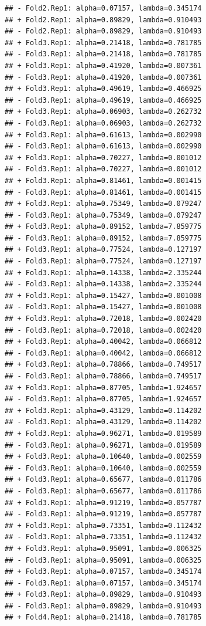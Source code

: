 \documentclass[
]{article}
\begin{document}
\begin{verbatim}
## - Fold2.Rep1: alpha=0.07157, lambda=0.345174 
## + Fold2.Rep1: alpha=0.89829, lambda=0.910493 
## - Fold2.Rep1: alpha=0.89829, lambda=0.910493 
## + Fold3.Rep1: alpha=0.21418, lambda=0.781785 
## - Fold3.Rep1: alpha=0.21418, lambda=0.781785 
## + Fold3.Rep1: alpha=0.41920, lambda=0.007361 
## - Fold3.Rep1: alpha=0.41920, lambda=0.007361 
## + Fold3.Rep1: alpha=0.49619, lambda=0.466925 
## - Fold3.Rep1: alpha=0.49619, lambda=0.466925 
## + Fold3.Rep1: alpha=0.06903, lambda=0.262732 
## - Fold3.Rep1: alpha=0.06903, lambda=0.262732 
## + Fold3.Rep1: alpha=0.61613, lambda=0.002990 
## - Fold3.Rep1: alpha=0.61613, lambda=0.002990 
## + Fold3.Rep1: alpha=0.70227, lambda=0.001012 
## - Fold3.Rep1: alpha=0.70227, lambda=0.001012 
## + Fold3.Rep1: alpha=0.81461, lambda=0.001415 
## - Fold3.Rep1: alpha=0.81461, lambda=0.001415 
## + Fold3.Rep1: alpha=0.75349, lambda=0.079247 
## - Fold3.Rep1: alpha=0.75349, lambda=0.079247 
## + Fold3.Rep1: alpha=0.89152, lambda=7.859775 
## - Fold3.Rep1: alpha=0.89152, lambda=7.859775 
## + Fold3.Rep1: alpha=0.77524, lambda=0.127197 
## - Fold3.Rep1: alpha=0.77524, lambda=0.127197 
## + Fold3.Rep1: alpha=0.14338, lambda=2.335244 
## - Fold3.Rep1: alpha=0.14338, lambda=2.335244 
## + Fold3.Rep1: alpha=0.15427, lambda=0.001008 
## - Fold3.Rep1: alpha=0.15427, lambda=0.001008 
## + Fold3.Rep1: alpha=0.72018, lambda=0.002420 
## - Fold3.Rep1: alpha=0.72018, lambda=0.002420 
## + Fold3.Rep1: alpha=0.40042, lambda=0.066812 
## - Fold3.Rep1: alpha=0.40042, lambda=0.066812 
## + Fold3.Rep1: alpha=0.78866, lambda=0.749517 
## - Fold3.Rep1: alpha=0.78866, lambda=0.749517 
## + Fold3.Rep1: alpha=0.87705, lambda=1.924657 
## - Fold3.Rep1: alpha=0.87705, lambda=1.924657 
## + Fold3.Rep1: alpha=0.43129, lambda=0.114202 
## - Fold3.Rep1: alpha=0.43129, lambda=0.114202 
## + Fold3.Rep1: alpha=0.96271, lambda=0.019589 
## - Fold3.Rep1: alpha=0.96271, lambda=0.019589 
## + Fold3.Rep1: alpha=0.10640, lambda=0.002559 
## - Fold3.Rep1: alpha=0.10640, lambda=0.002559 
## + Fold3.Rep1: alpha=0.65677, lambda=0.011786 
## - Fold3.Rep1: alpha=0.65677, lambda=0.011786 
## + Fold3.Rep1: alpha=0.91219, lambda=0.057787 
## - Fold3.Rep1: alpha=0.91219, lambda=0.057787 
## + Fold3.Rep1: alpha=0.73351, lambda=0.112432 
## - Fold3.Rep1: alpha=0.73351, lambda=0.112432 
## + Fold3.Rep1: alpha=0.95091, lambda=0.006325 
## - Fold3.Rep1: alpha=0.95091, lambda=0.006325 
## + Fold3.Rep1: alpha=0.07157, lambda=0.345174 
## - Fold3.Rep1: alpha=0.07157, lambda=0.345174 
## + Fold3.Rep1: alpha=0.89829, lambda=0.910493 
## - Fold3.Rep1: alpha=0.89829, lambda=0.910493 
## + Fold4.Rep1: alpha=0.21418, lambda=0.781785 

\end{verbatim}
\end{document}
